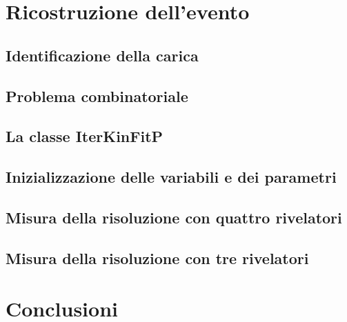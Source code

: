 \documentclass[8pt]{extarticle}
\begin{document}
\section{Ricostruzione dell'evento} \label{sec:reconstruction}
\subsection{Identificazione della carica}
\subsection{Problema combinatoriale}
\subsection{La classe IterKinFitP}
\subsection{Inizializzazione delle variabili e dei parametri}
\subsection{Misura della risoluzione con quattro rivelatori}
\subsection{Misura della risoluzione con tre rivelatori}

\section{Conclusioni} \label{sec:conclusioni}
\end{document}
